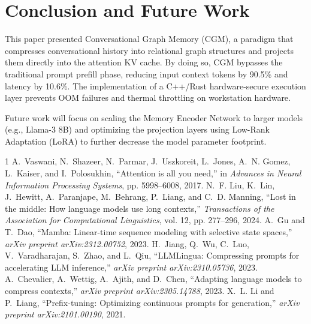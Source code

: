 \documentclass[conference]{IEEEtran}
\begin{document}
\section{Conclusion and Future Work}
This paper presented Conversational Graph Memory (CGM), a paradigm that compresses conversational history into relational graph structures and projects them directly into the attention KV cache. By doing so, CGM bypasses the traditional prompt prefill phase, reducing input context tokens by 90.5\% and latency by 10.6\%. The implementation of a C++/Rust hardware-secure execution layer prevents OOM failures and thermal throttling on workstation hardware.

Future work will focus on scaling the Memory Encoder Network to larger models (e.g., Llama-3 8B) and optimizing the projection layers using Low-Rank Adaptation (LoRA) to further decrease the model parameter footprint.


\begin{thebibliography}{1}
A.~Vaswani, N.~Shazeer, N.~Parmar, J.~Uszkoreit, L.~Jones, A.~N. Gomez, L.~Kaiser, and I.~Polosukhin, ``Attention is all you need,'' in \textit{Advances in Neural Information Processing Systems}, pp. 5998--6008, 2017.
N.~F. Liu, K.~Lin, J.~Hewitt, A.~Paranjape, M.~Behrang, P.~Liang, and C.~D. Manning, ``Lost in the middle: How language models use long contexts,'' \textit{Transactions of the Association for Computational Linguistics}, vol. 12, pp. 277--296, 2024.
A.~Gu and T.~Dao, ``Mamba: Linear-time sequence modeling with selective state spaces,'' \textit{arXiv preprint arXiv:2312.00752}, 2023.
H.~Jiang, Q.~Wu, C.~Luo, V.~Varadharajan, S.~Zhao, and L.~Qiu, ``LLMLingua: Compressing prompts for accelerating LLM inference,'' \textit{arXiv preprint arXiv:2310.05736}, 2023.
A.~Chevalier, A.~Wettig, A.~Ajith, and D.~Chen, ``Adapting language models to compress contexts,'' \textit{arXiv preprint arXiv:2305.14788}, 2023.
X.~L. Li and P.~Liang, ``Prefix-tuning: Optimizing continuous prompts for generation,'' \textit{arXiv preprint arXiv:2101.00190}, 2021.
\end{thebibliography}
\end{document}
